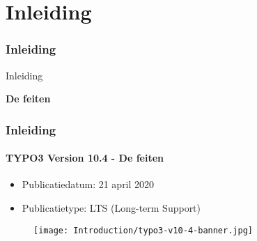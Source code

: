 %

\section{Inleiding}
\begin{frame}[fragile]
	\frametitle{Inleiding}

	\begin{center}\huge{Inleiding}\end{center}
	\begin{center}\huge{\color{typo3darkgrey}\textbf{De feiten}}\end{center}

\end{frame}


\begin{frame}[fragile]
	\frametitle{Inleiding}
	\framesubtitle{TYPO3 Version 10.4 - De feiten}

	\begin{itemize}
		\item Publicatiedatum: 21 april 2020
		\item Publicatietype: LTS (Long-term Support)
	\end{itemize}

	\begin{figure}
		\texttt{[image: Introduction/typo3-v10-4-banner.jpg]}
	\end{figure}

\end{frame}


